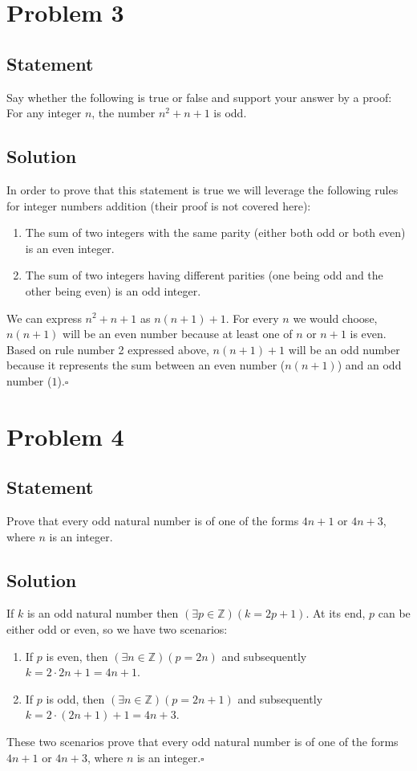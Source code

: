 \documentclass[12pt,letter]{memoir}
\begin{document}
\chapter{Problem 3}
\section*{Statement}
Say whether the following is true or false and support your answer by a proof: For any integer $n$, the number $n^2 + n + 1$ is odd.
\section*{Solution}
In order to prove that this statement is true we will leverage the following rules for integer numbers addition (their proof is not covered here):
\begin{enumerate}
\item The sum of two integers with the same parity (either both odd or both even) is an even integer.
\item The sum of two integers having different parities (one being odd and the other being even) is an odd integer.
\end{enumerate}
We can express $n^2 + n + 1$ as $n(n+1) + 1$.
For every $n$ we would choose, $n(n+1)$ will be an even number because at least one of $n$ or $n+1$ is even. Based on rule number 2 expressed above, $n(n+1)+1$ will be an odd number because it represents the sum between an even number ($n(n+1)$) and an odd number ($1$).$\square$

\chapter{Problem 4}
\section*{Statement}
Prove that every odd natural number is of one of the forms $4n + 1$ or $4n + 3$, where $n$ is an integer.
\section*{Solution}
If $k$ is an odd natural number then $(\exists p \in \mathbb{Z})(k=2p+1)$. At its end, $p$ can be either odd or even, so we have two scenarios:
\begin{enumerate}
\item If $p$ is even, then $(\exists n \in \mathbb{Z})(p=2n)$ and subsequently $k=2\cdot2n+1=4n+1$.
\item If $p$ is odd, then $(\exists n \in \mathbb{Z})(p=2n+1)$ and subsequently $k=2\cdot(2n+1)+1=4n+3$.
\end{enumerate}
These two scenarios prove that every odd natural number is of one of the forms $4n + 1$ or $4n + 3$, where $n$ is an integer.$\square$
\end{document}
